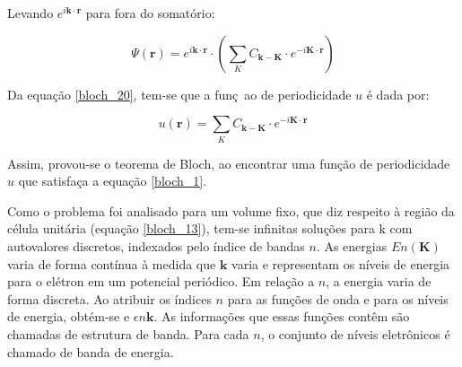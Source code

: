 	\par Levando $e^{i\mathbf{k} \cdot \mathbf{r}}$ para fora do somatório:

	\begin{equation}
		\label{bloch_20}
		\Psi (\mathbf{r}) = e^{i\mathbf{k}\cdot\mathbf{r}} \cdot \left(\sum_{K} C_{\mathbf{k-K}}\cdot e^{-i \mathbf{K}\cdot\mathbf{r}}\right)
	\end{equation}

	\par Da equação \eqref{bloch_20}, tem-se que a funç~ao de periodicidade $u$ é dada por:

	\begin{equation}
		\label{bloch_21}
		u(\mathbf{r}) = \sum_{K} C_{\mathbf{k-K}}\cdot e^{-i \mathbf{K}\cdot\mathbf{r}}
	\end{equation}

	\par Assim, provou-se o teorema de Bloch, ao encontrar uma função de periodicidade $u$ que satisfaça a equação \eqref{bloch_1}.

	\par Como o problema foi analisado para um volume fixo, que diz respeito à região da célula unitária (equação \eqref{bloch_13}), tem-se infinitas soluções para k  com autovalores discretos, indexados pelo índice de bandas $n$. As energias $En(\mathbf{K})$ varia de forma contínua à medida que $\mathbf{k}$ varia e representam os níveis de energia para o elétron em um potencial periódico. Em relação a $n$, a energia varia de forma discreta. Ao atribuir os índices $n$ para as funções de onda e para os níveis de energia, obtém-se e $\epsilon n\mathbf{k}$. As informações que essas funções contêm são chamadas de estrutura de banda. Para cada $n$, o conjunto de níveis eletrônicos é chamado de banda de energia\cite{qm_fis5}. 

